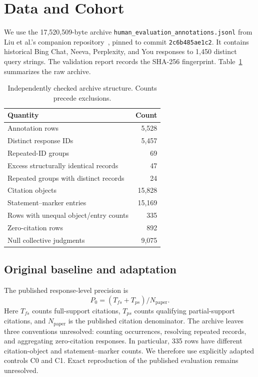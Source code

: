 \documentclass[acmsmall,screen,nonacm]{acmart}
\begin{document}
\section{Data and Cohort}
We use the 17,520,509-byte archive \texttt{human\_evaluation\_annotations.jsonl} from Liu et al.'s companion repository~\cite{archive}, pinned to commit \texttt{2c6b485ae1c2}. It contains historical Bing Chat, Neeva, Perplexity, and You responses to 1,450 distinct query strings. The validation report records the SHA-256 fingerprint. Table~\ref{tab:structure} summarizes the raw archive.
\begin{table}[!htbp]
\centering\small
\caption{Independently checked archive structure. Counts precede exclusions.}
\begin{tabular}{lr}\toprule
Quantity & Count\\\midrule
Annotation rows & 5,528\\
Distinct response IDs & 5,457\\
Repeated-ID groups & 69\\
Excess structurally identical records & 47\\
Repeated groups with distinct records & 24\\
Citation objects & 15,828\\
Statement--marker entries & 15,169\\
Rows with unequal object/entry counts & 335\\
Zero-citation rows & 892\\
Null collective judgments & 9,075\\\bottomrule
\end{tabular}
\label{tab:structure}
\end{table}

\subsection{Original baseline and adaptation}
The published response-level precision is
\begin{equation}
 P_0=(T_{fs}+T_{ps})/N_{\mathrm{paper}}.
\end{equation}
Here $T_{fs}$ counts full-support citations, $T_{ps}$ counts qualifying partial-support citations, and $N_{\mathrm{paper}}$ is the published citation denominator. The archive leaves three conventions unresolved: counting occurrences, resolving repeated records, and aggregating zero-citation responses. In particular, 335 rows have different citation-object and statement--marker counts. We therefore use explicitly adapted controls C0 and C1. Exact reproduction of the published evaluation remains unresolved.
\end{document}
